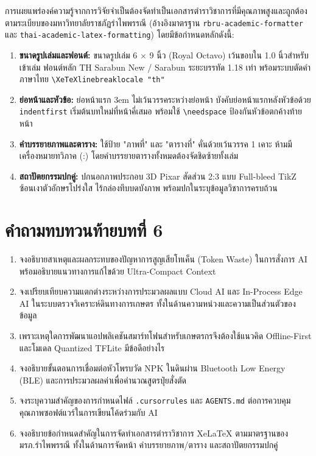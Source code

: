 
การเผยแพร่องค์ความรู้จากการวิจัยจำเป็นต้องจัดทำเป็นเอกสารตำราวิชาการที่มีคุณภาพสูงและถูกต้องตามระเบียบของมหาวิทยาลัยราชภัฏรำไพพรรณี (อ้างอิงมาตรฐาน \texttt{rbru-academic-formatter} และ \texttt{thai-academic-latex-formatting}) โดยมีข้อกำหนดหลักดังนี้:

\begin{enumerate}
    \item \textbf{ขนาดรูปเล่มและฟอนต์:} ขนาดรูปเล่ม 6 $\times$ 9 นิ้ว (Royal Octavo) เว้นขอบใน 1.0 นิ้วสำหรับเข้าเล่ม ฟอนต์หลัก TH Sarabun New / Sarabun ระยะบรรทัด 1.18 เท่า พร้อมระบบตัดคำภาษาไทย \texttt{\textbackslash XeTeXlinebreaklocale "th"}
    \item \textbf{ย่อหน้าและหัวข้อ:} ย่อหน้าแรก 3em ไม่เว้นวรรคระหว่างย่อหน้า บังคับย่อหน้าแรกหลังหัวข้อด้วย \texttt{indentfirst} เริ่มต้นบทใหม่ที่หน้าคี่เสมอ พร้อมใช้ \texttt{\textbackslash needspace} ป้องกันหัวข้อตกค้างท้ายหน้า
    \item \textbf{คำบรรยายภาพและตาราง:} ใช้ป้าย "ภาพที่" และ "ตารางที่" คั่นด้วยเว้นวรรค 1 เคาะ ห้ามมีเครื่องหมายทวิภาค (:) โดยคำบรรยายตารางทั้งหมดต้องจัดชิดซ้ายทั้งเล่ม
    \item \textbf{สถาปัตยกรรมปกคู่:} ปกนอกภาพประกอบ 3D Pixar สัดส่วน 2:3 แบบ Full-bleed TikZ ซ้อนเงาตัวอักษรโปร่งใส ไร้กล่องทึบบดบังภาพ พร้อมปกในระบุข้อมูลวิชาการครบถ้วน
\end{enumerate}

\section*{คำถามทบทวนท้ายบทที่ 6}

\begin{enumerate}
    \item จงอธิบายสาเหตุและผลกระทบของปัญหาการสูญเสียโทเค็น (Token Waste) ในการสั่งการ AI พร้อมอธิบายแนวทางการแก้ไขด้วย Ultra-Compact Context
    \item จงเปรียบเทียบความแตกต่างระหว่างการประมวลผลแบบ Cloud AI และ In-Process Edge AI ในระบบตรวจวิเคราะห์ดินทางการเกษตร ทั้งในด้านความหน่วงและความเป็นส่วนตัวของข้อมูล
    \item เพราะเหตุใดการพัฒนาแอปพลิเคชันสมาร์ทโฟนสำหรับเกษตรกรจึงต้องใช้แนวคิด Offline-First และโมเดล Quantized TFLite มีข้อดีอย่างไร
    \item จงอธิบายขั้นตอนการเชื่อมต่อหัวโพรบวัด NPK ในดินผ่าน Bluetooth Low Energy (BLE) และการประมวลผลค่าเพื่อคำนวณสูตรปุ๋ยสั่งตัด
    \item จงระบุความสำคัญของการกำหนดไฟล์ \texttt{.cursorrules} และ \texttt{AGENTS.md} ต่อการควบคุมคุณภาพซอฟต์แวร์ในการเขียนโค้ดร่วมกับ AI
    \item จงอธิบายข้อกำหนดสำคัญในการจัดทำเอกสารตำราวิชาการ XeLaTeX ตามมาตรฐานของ มรภ.รำไพพรรณี ทั้งในด้านการจัดหน้า คำบรรยายภาพ/ตาราง และสถาปัตยกรรมปกคู่
\end{enumerate}

\clearpage
